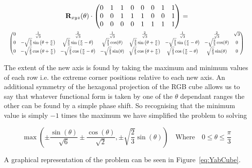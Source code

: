 \begin{multline}\label{eq:YabCube}
  \R_{xyz}(\theta)\cdot
\begin{pmatrix}
 0 & 1 & 1 & 0 & 0 & 0 & 1 & 1 \\
 0 & 0 & 1 & 1 & 1 & 0 & 0 & 1 \\
 0 & 0 & 0 & 0 & 1 & 1 & 1 & 1 \\
\end{pmatrix}
 = \\
\resizebox{\textwidth}{!}{%
$\displaystyle
\begin{pmatrix}
 0 & \frac{1}{\sqrt{3}} & \frac{2}{\sqrt{3}} & \frac{1}{\sqrt{3}} & \frac{2}{\sqrt{3}} & \frac{1}{\sqrt{3}} & \frac{2}{\sqrt{3}} & \sqrt{3} \\
 0 & -\sqrt{\frac{2}{3}} \sin \left(\theta +\Pii{6}\right) & \sqrt{\frac{2}{3}} \sin \left(\Pii{6}-\theta \right) & \sqrt{\frac{2}{3}} \cos (\theta ) & \sqrt{\frac{2}{3}} \sin \left(\theta +\Pii{6}\right) & -\sqrt{\frac{2}{3}} \sin \left(\Pii{6}-\theta \right) & -\sqrt{\frac{2}{3}} \cos (\theta ) & 0 \\
 0 & -\sqrt{\frac{2}{3}} \cos \left(\theta +\Pii{6}\right) & -\sqrt{\frac{2}{3}} \cos \left(\Pii{6}-\theta \right) & -\sqrt{\frac{2}{3}} \sin (\theta ) & \sqrt{\frac{2}{3}} \cos \left(\theta +\Pii{6}\right) & \sqrt{\frac{2}{3}} \cos \left(\Pii{6}-\theta \right) & \sqrt{\frac{2}{3}} \sin (\theta ) & 0 \\
\end{pmatrix}$}
\end{multline}


The extent of the new axis is found by taking the maximum and minimum values of each row i.e. the extreme corner positions relative to each new axis. An additional symmetry of the hexagonal projection of the RGB cube allows us to say that whatever functional form is taken by one of the $\theta$ dependant ranges the other can be found by a simple phase shift. So recognising that the minimum value is simply $-1$ times the maximum we have simplified the problem to solving

\begin{equation}\label{eq:AxisRangeMinMax}
 \max\left(\pm\frac{\sin (\theta )}{\sqrt{6}}\pm\frac{\cos (\theta )}{\sqrt{2}}, \pm\sqrt{\frac{2}{3}} \sin (\theta ) \right) \quad \text{Where} \quad 0\leq \theta \leq \frac{\pi}{3}
\end{equation}

A graphical representation of the problem can be seen in Figure~\ref{eq:YabCube}.

